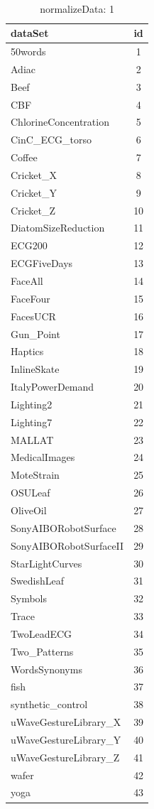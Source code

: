   
\begin{table} 
\begin{center} 
\ 
 \setlength{\tabcolsep}{.16667em} 
\begin{tabular}{lc} 
dataSet & id \\ 
\hline 
50words &  1 \\ 
Adiac &  2 \\ 
Beef &  3 \\ 
CBF &  4 \\ 
ChlorineConcentration &  5 \\ 
CinC\_ECG\_torso &  6 \\ 
Coffee &  7 \\ 
Cricket\_X &  8 \\ 
Cricket\_Y &  9 \\ 
Cricket\_Z & 10 \\ 
DiatomSizeReduction & 11 \\ 
ECG200 & 12 \\ 
ECGFiveDays & 13 \\ 
FaceAll & 14 \\ 
FaceFour & 15 \\ 
FacesUCR & 16 \\ 
Gun\_Point & 17 \\ 
Haptics & 18 \\ 
InlineSkate & 19 \\ 
ItalyPowerDemand & 20 \\ 
Lighting2 & 21 \\ 
Lighting7 & 22 \\ 
MALLAT & 23 \\ 
MedicalImages & 24 \\ 
MoteStrain & 25 \\ 
OSULeaf & 26 \\ 
OliveOil & 27 \\ 
SonyAIBORobotSurface & 28 \\ 
SonyAIBORobotSurfaceII & 29 \\ 
StarLightCurves & 30 \\ 
SwedishLeaf & 31 \\ 
Symbols & 32 \\ 
Trace & 33 \\ 
TwoLeadECG & 34 \\ 
Two\_Patterns & 35 \\ 
WordsSynonyms & 36 \\ 
fish & 37 \\ 
synthetic\_control & 38 \\ 
uWaveGestureLibrary\_X & 39 \\ 
uWaveGestureLibrary\_Y & 40 \\ 
uWaveGestureLibrary\_Z & 41 \\ 
wafer & 42 \\ 
yoga & 43 \\ 
\end{tabular} 
\end{center} 
\caption{normalizeData: 1} 
\label{noda1} 
\end{table} 
 
